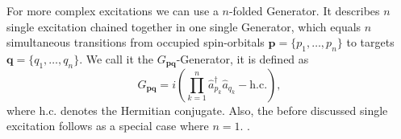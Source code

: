 For more complex excitations we can use a $n$-folded Generator.
It describes $n$ single excitation chained together in one single Generator, which equals $n$ simultaneous transitions from occupied spin-orbitals $\mathbf{p} = \{p_1, \dots, p_n\}$ to targets $\mathbf{q} = \{q_1, \dots, q_n\}$.
We call it the $G_{\boldsymbol{pq}}$-Generator, it is defined as
\begin{equation}
    \label{eq:mult_fe_exc_generator}
    G_{\mathbf{pq}} = i \left( \prod_{k=1}^{n} \hat{a}^\dagger_{p_k} \hat{a}_{q_k} - \text{h.c.} \right),
\end{equation}
where h.c. denotes the Hermitian conjugate.
Also, the before discussed single excitation follows as a special case where $n = 1$.
\cite[Ch.~II]{kottmann2020feasible}\cite[Ch.~III.A]{anand2022quantum}.


















